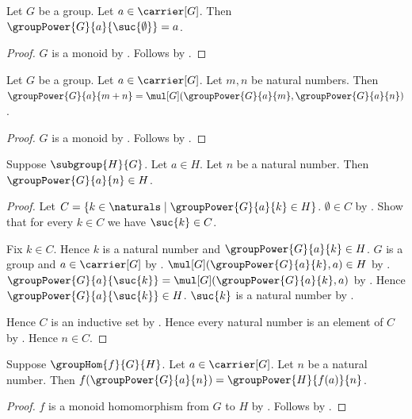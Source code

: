 \begin{proposition}\label{group_power_one}
    Let $G$ be a group.
    Let $a\in\carrier[G]$.
    Then $\groupPower{G}{a}{\suc{\emptyset}}=a$.
\end{proposition}
\begin{proof}
    $G$ is a monoid by .
    Follows by .
\end{proof}

\begin{theorem}\label{group_power_addition}
    Let $G$ be a group.
    Let $a\in\carrier[G]$.
    Let $m,n$ be natural numbers.
    Then $\groupPower{G}{a}{m+n}=
        \mul[G](\groupPower{G}{a}{m},\groupPower{G}{a}{n})$.
\end{theorem}
\begin{proof}
    $G$ is a monoid by .
    Follows by .
\end{proof}

\begin{theorem}\label{group_power_in_subgroup}
    Suppose $\subgroup{H}{G}$.
    Let $a\in H$.
    Let $n$ be a natural number.
    Then $\groupPower{G}{a}{n}\in H$.
\end{theorem}
\begin{proof}
    Let $C=\{k\in\naturals\mid \groupPower{G}{a}{k}\in H\}$.
    $\emptyset\in C$ by
        .
    Show that for every $k\in C$ we have $\suc{k}\in C$.
    \begin{subproof}
        Fix $k\in C$.
        Hence $k$ is a natural number and
            $\groupPower{G}{a}{k}\in H$.
        $G$ is a group and $a\in\carrier[G]$ by
            .
        $\mul[G](\groupPower{G}{a}{k},a)\in H$ by
            .
        $\groupPower{G}{a}{\suc{k}}=
            \mul[G](\groupPower{G}{a}{k},a)$ by
            .
        Hence $\groupPower{G}{a}{\suc{k}}\in H$.
        $\suc{k}$ is a natural number by .
    \end{subproof}
    Hence $C$ is an inductive set by .
    Hence every natural number is an element of $C$ by
        .
    Hence $n\in C$.
\end{proof}

\begin{theorem}\label{group_hom_preserves_power}
    Suppose $\groupHom{f}{G}{H}$.
    Let $a\in\carrier[G]$.
    Let $n$ be a natural number.
    Then $f(\groupPower{G}{a}{n})=
        \groupPower{H}{f(a)}{n}$.
\end{theorem}
\begin{proof}
    $f$ is a monoid homomorphism from $G$ to $H$ by
        .
    Follows by
        .
\end{proof}
